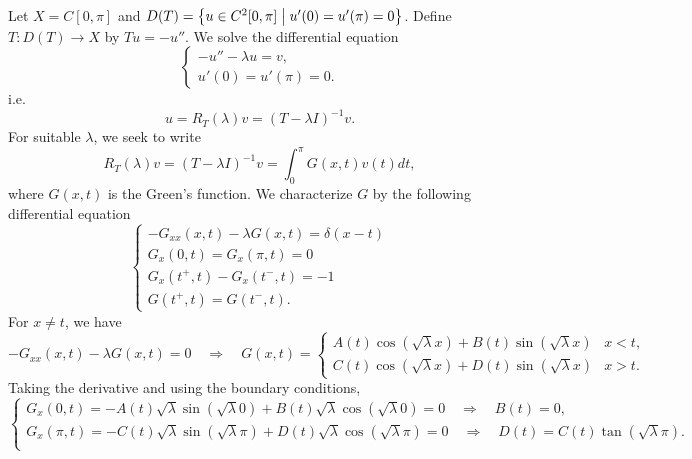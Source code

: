 \begin{example}
    Let $X = C[0,\pi]$ and $D(T) = \left\{ u\in C^2[0,\pi] \;\middle\vert\; u'(0) = u'(\pi) = 0 \right\}$.
    Define $T:D(T)\to X$ by $Tu = -u''$. We solve the differential equation 
    \begin{equation*}
        \begin{cases}
            -u'' - \lambda u = v,\\
            u'(0) = u'(\pi) = 0.
        \end{cases}
    \end{equation*}
    i.e. 
    \begin{equation*}
        u = R_T(\lambda)v = (T-\lambda I)^{-1}v.
    \end{equation*}
    For suitable $\lambda$, we seek to write 
    \begin{equation*}
        R_T(\lambda)v = (T-\lambda I)^{-1}v = \int_0^\pi G(x,t)v(t)dt,
    \end{equation*}
    where $G(x,t)$ is the Green's function. We characterize 
    $G$ by the following differential equation
    \begin{equation*}
        \begin{cases}
            -G_{xx}(x,t)-\lambda G(x,t) = \delta(x-t) \\ 
            G_x(0,t) = G_x(\pi,t) = 0 \\ 
            G_x(t^+,t) - G_x(t^-,t) = -1 \\
            G(t^+,t) = G(t^-,t).
        \end{cases}
    \end{equation*}
    For $x\neq t$, we have 
    \begin{equation*}
        -G_{xx}(x,t)-\lambda G(x,t) = 0\quad\Rightarrow\quad 
        G(x,t) = \begin{cases}
            A(t)\cos(\sqrt{\lambda}x) + B(t)\sin(\sqrt{\lambda}x) & x<t,\\
            C(t)\cos(\sqrt{\lambda}x) + D(t)\sin(\sqrt{\lambda}x) & x>t.
        \end{cases}
    \end{equation*}
    Taking the derivative and using the boundary conditions,
    \begin{equation*}
        \begin{cases}
            G_x(0,t) = -A(t)\sqrt{\lambda}\sin(\sqrt{\lambda}0) + B(t)\sqrt{\lambda}\cos(\sqrt{\lambda}0) = 0 \quad\Rightarrow\quad B(t) = 0,\\ 
            G_x(\pi,t) = -C(t)\sqrt{\lambda}\sin(\sqrt{\lambda}\pi) + D(t)\sqrt{\lambda}\cos(\sqrt{\lambda}\pi) = 0 \quad\Rightarrow\quad D(t) = C(t)\tan(\sqrt{\lambda}\pi).\\

\end{cases}
\end{equation*}
\end{example}
